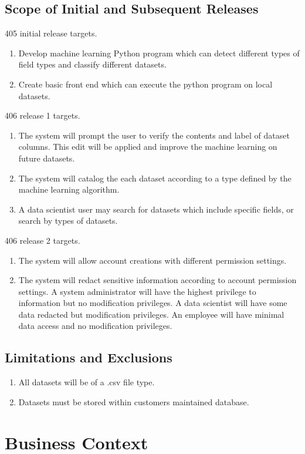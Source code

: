 \documentclass[12pt,oneside,letterpaper]{article}
\begin{document}
\subsection{Scope of Initial and Subsequent Releases}
405 initial release targets.
\begin{enumerate}
    \item Develop machine learning Python program which can detect different types of field types and classify different datasets.
    \item Create basic front end which can execute the python program on local datasets.
\end{enumerate}  
406 release 1 targets.
\begin{enumerate}
    \item The system will prompt the user to verify the contents and label of dataset columns. This edit will be applied and improve the machine learning on future datasets.
    \item The system will catalog the each dataset according to a type defined by the machine learning algorithm.
    \item A data scientist user may search for datasets which include specific fields, or search by types of datasets.
\end{enumerate}
406 release 2 targets.
\begin{enumerate}
    \item The system will allow account creations with different permission settings.
    \item The system will redact sensitive information according to account permission settings. A system administrator will have the highest privilege to information but no modification privileges. A data scientist will have some data redacted but modification privileges. An employee will have minimal data access and no modification privileges.
\end{enumerate}
\subsection{Limitations and Exclusions}
\begin{enumerate}
    \item All datasets will be of a .csv file type.
    \item Datasets must be stored within customers maintained database.
\end{enumerate}




\section{Business Context}
\end{document}
